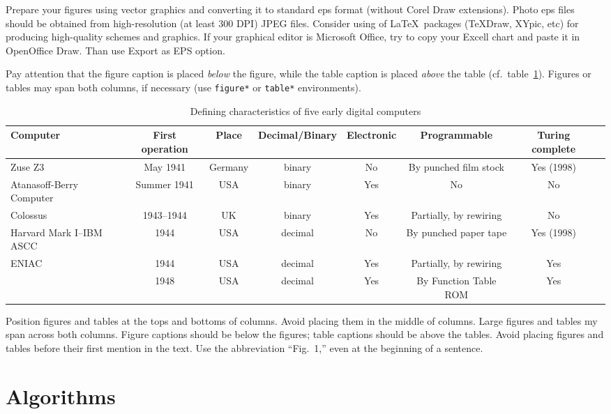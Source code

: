 \documentclass[conference]{IEEEtran}
\begin{document}
Prepare your figures using vector graphics and converting it to standard eps format (without Corel Draw extensions). Photo eps files should be obtained from high-resolution (at least 300 DPI) JPEG files. Consider using of \LaTeX\ packages (TeXDraw, XYpic, etc) for producing high-quality schemes and graphics. If your graphical editor is Microsoft Office, try to copy your Excell chart and paste it in OpenOffice Draw. Than use Export as EPS option.


Pay attention that the figure caption is placed \emph{below} the figure, while the table caption is placed \emph{above} the table (cf.~table~\ref{table}). Figures or tables may span both columns, if necessary (use \texttt{figure*} or \texttt{table*} environments).


\begin{table}[tbp]
\caption{Defining characteristics of five early digital computers}\label{table}
\centering
\begin{tabular}{|@{\vrule width0ptheight9pt\enspace}l|c|c|c|c|c|c|c|}\hline
\hfil\bf Computer&\bf First operation&\bf Place& \bf Decimal/Binary&\bf Electronic&\bf Programmable&\bf Turing complete\\\hline
Zuse Z3&May 1941&Germany&binary&No&By punched film stock&Yes (1998)\\\hline
Atanasoff-Berry Computer&Summer 1941&USA&binary&Yes&No&No\\\hline
Colossus&1943--1944&UK&binary&Yes&Partially, by rewiring&No\\\hline
Harvard Mark I--IBM ASCC&1944&USA&decimal&No&By punched paper tape&Yes (1998)\\\hline
\multirow{2}{*}{ENIAC}&1944&USA&decimal&Yes&Partially, by rewiring&Yes\\\cline{2-7}
&1948&USA&decimal&Yes&By Function Table ROM&Yes\\\hline
\end{tabular}
\end{table}

Position figures and tables at the tops and bottoms of columns.  Avoid placing them in the middle of columns.  Large figures and tables my span across both columns.  Figure captions should be below the figures; table captions should be above the tables.  Avoid placing figures and tables before their first mention in the text.  Use the abbreviation ``Fig.~1,'' even at the beginning of a sentence.


\section{Algorithms}
\end{document}

